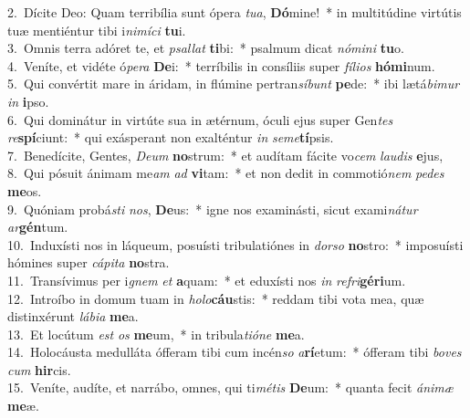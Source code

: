 {2.~}Dícite Deo: Quam terribília sunt ópera \textit{tu}\textit{a}, \textbf{Dó}mine!~* in multitúdine virtútis tuæ mentiéntur tibi i\textit{ni}\textit{mí}\textit{ci} \textbf{tu}i.\\
{3.~}Omnis terra adóret te, et \textit{psal}\textit{lat} \textbf{ti}bi:~* psalmum dicat \textit{nó}\textit{mi}\textit{ni} \textbf{tu}o.\\
{4.~}Veníte, et vidéte ó\textit{pe}\textit{ra} \textbf{De}i:~* terríbilis in consíliis super \textit{fí}\textit{li}\textit{os} \textbf{hó}\textbf{mi}num.\\
{5.~}Qui convértit mare in áridam, in flúmine pertran\textit{sí}\textit{bunt} \textbf{pe}de:~* ibi lætá\textit{bi}\textit{mur} \textit{in} \textbf{i}pso.\\
{6.~}Qui dominátur in virtúte sua in ætérnum, óculi ejus super Gen\textit{tes} \textit{re}\textbf{spí}ciunt:~* qui exásperant non exalténtur \textit{in} \textit{se}\textit{me}\textbf{tí}psis.\\
{7.~}Benedícite, Gentes, \textit{De}\textit{um} \textbf{no}strum:~* et audítam fácite vo\textit{cem} \textit{lau}\textit{dis} \textbf{e}jus,\\
{8.~}Qui pósuit ánimam me\textit{am} \textit{ad} \textbf{vi}tam:~* et non dedit in commotió\textit{nem} \textit{pe}\textit{des} \textbf{me}os.\\
{9.~}Quóniam probá\textit{sti} \textit{nos}, \textbf{De}us:~* igne nos examinásti, sicut exami\textit{ná}\textit{tur} \textit{ar}\textbf{gén}tum.\\
{10.~}Induxísti nos in láqueum, posuísti tribulatiónes in \textit{dor}\textit{so} \textbf{no}stro:~* imposuísti hómines super \textit{cá}\textit{pi}\textit{ta} \textbf{no}stra.\\
{11.~}Transívimus per i\textit{gnem} \textit{et} \textbf{a}quam:~* et eduxísti nos \textit{in} \textit{re}\textit{fri}\textbf{gé}\textbf{ri}um.\\
{12.~}Introíbo in domum tuam in \textit{ho}\textit{lo}\textbf{cáu}stis:~* reddam tibi vota mea, quæ distinxérunt \textit{lá}\textit{bi}\textit{a} \textbf{me}a.\\
{13.~}Et locútum \textit{est} \textit{os} \textbf{me}um,~* in tribula\textit{ti}\textit{ó}\textit{ne} \textbf{me}a.\\
{14.~}Holocáusta medulláta ófferam tibi cum incén\textit{so} \textit{a}\textbf{rí}etum:~* ófferam tibi \textit{bo}\textit{ves} \textit{cum} \textbf{hir}cis.\\
{15.~}Veníte, audíte, et narrábo, omnes, qui ti\textit{mé}\textit{tis} \textbf{De}um:~* quanta fecit \textit{á}\textit{ni}\textit{mæ} \textbf{me}æ.\\

